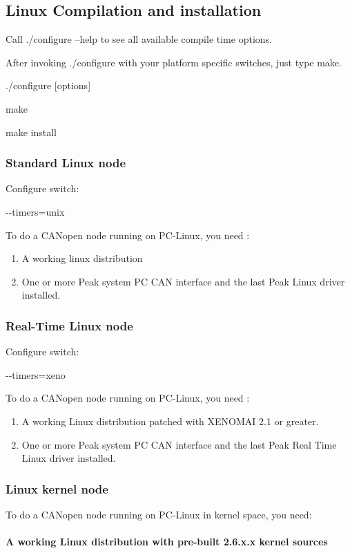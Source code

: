 \documentclass[a4paper,12pt]{book}
\newcommand\liststyleLvii{%
\renewcommand\labelitemi{{--}}
\renewcommand\labelitemii{{--}}
\renewcommand\labelitemiii{{--}}
\renewcommand\labelitemiv{{--}}
}
\newcommand\liststyleLviii{%
\renewcommand\labelitemi{{--}}
\renewcommand\labelitemii{{--}}
\renewcommand\labelitemiii{{--}}
\renewcommand\labelitemiv{{--}}
}
\newcommand{\canopen}{CANopen}
\begin{document}
\subsection{Linux Compilation and installation}
Call ./configure {--}help to see all available compile time options.

After invoking ./configure with your platform specific switches, just
type make.

{\ttfamily
./configure [options]}

{\ttfamily
make}

{\ttfamily
make install}

\subsubsection{Standard Linux node}
Configure switch:

{\ttfamily
 {}-{}-timers=unix}

To do a \canopen{} node running on PC{}-Linux, you need :

\liststyleLvii
\begin{enumerate}
\item A working linux distribution
\item One or more Peak system PC CAN interface and the last Peak Linux
driver installed.
\end{enumerate}
\subsubsection{Real{}-Time Linux node}
Configure switch:

{\ttfamily
 {}-{}-timers=xeno}

To do a \canopen{} node running on PC{}-Linux, you need :

\liststyleLviii
\begin{enumerate}
\item A working Linux distribution patched with XENOMAI 2.1 or greater.
\item One or more Peak system PC CAN interface and the last Peak Real
Time Linux driver installed.
\end{enumerate}

\subsubsection{Linux kernel node}
To do a CANopen node running on PC-Linux in kernel space, you need:

\paragraph{A working Linux distribution with pre-built 2.6.x.x kernel sources}
\end{document}
